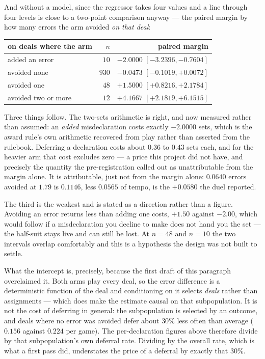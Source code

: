 \documentclass[11pt,a4paper]{article}
\begin{document}
\noindent And without a model, since the regressor takes four values and a
line through four levels is close to a two-point comparison anyway --- the
paired margin by how many errors the arm avoided \emph{on that deal}:

\begin{center}
\small
\begin{tabular}{lrr}
\toprule
on deals where the arm & $n$ & paired margin \\
\midrule
added an error & $10$ & $\mathbf{-2.0000}$ $[-3.2396, -0.7604]$ \\
avoided none & $930$ & $-0.0473$ $[-0.1019, +0.0072]$ \\
avoided one & $48$ & $+1.5000$ $[+0.8216, +2.1784]$ \\
avoided two or more & $12$ & $+4.1667$ $[+2.1819, +6.1515]$ \\
\bottomrule
\end{tabular}
\end{center}

Three things follow. The two-sets arithmetic is right, and now measured
rather than assumed: an \emph{added} misdeclaration costs exactly $-2.0000$
sets, which is the award rule's own arithmetic recovered from play rather than
asserted from the rulebook. Deferring a declaration costs about $0.36$ to
$0.43$ sets each, and for the heavier arm that cost excludes zero --- a price
this project did not have, and precisely the quantity the pre-registration
called out as unattributable from the margin alone. It is attributable, just
not from the margin alone: $0.0640$ errors avoided at $1.79$ is $0.1146$,
less $0.0565$ of tempo, is the $+0.0580$ the duel reported.

The third is the weakest and is stated as a direction rather than a figure.
Avoiding an error returns less than adding one costs, $+1.50$ against $-2.00$,
which would follow if a misdeclaration you decline to make does not hand you
the set --- the half-suit stays live and can still be lost. At $n = 48$ and
$n = 10$ the two intervals overlap comfortably and this is a hypothesis the
design was not built to settle.

What the intercept is, precisely, because the first draft of this paragraph
overclaimed it. Both arms play every deal, so the error difference is a
deterministic function of the deal and conditioning on it selects \emph{deals}
rather than assignments --- which does make the estimate causal on that
subpopulation. It is not the cost of deferring in general: the subpopulation is
selected by an outcome, and deals where no error was avoided defer about
$30\%$ less often than average ($0.156$ against $0.224$ per game). The
per-declaration figures above therefore divide by that subpopulation's own
deferral rate. Dividing by the overall rate, which is what a first pass did,
understates the price of a deferral by exactly that $30\%$.
\end{document}
